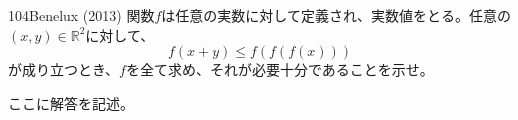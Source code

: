 \begin{prob}{104}{}{Benelux (2013)}
 関数$f$は任意の実数に対して定義され、実数値をとる。任意の$(x,y)\in\mathbb{R}^2$に対して、
 \[ f(x+y) \leq f\left(f\left(f(x)\right)\right) \]
 が成り立つとき、$f$を全て求め、それが必要十分であることを示せ。
\end{prob}
ここに解答を記述。
